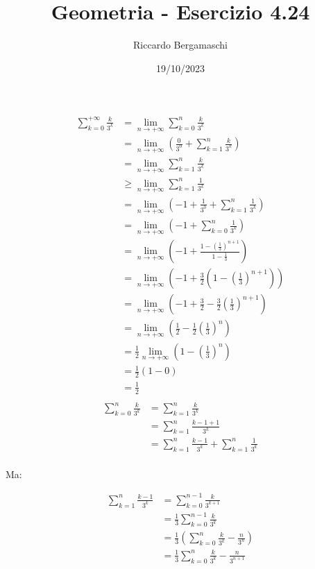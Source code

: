\documentclass{article}
\title{Geometria - Esercizio 4.24}
\author{Riccardo Bergamaschi}
\date{19/10/2023}
\newcommand*{\oo}{\infty}
\newcommand*{\limit}[2]{\lim_{#1\rightarrow#2}}
\begin{document}
\[\begin{aligned}
    \sum_{k=0}^{+\oo}\frac{k}{3^k}
    &= \limit{n}{+\oo}\sum_{k=0}^{n}\frac{k}{3^k}\\
    &= \limit{n}{+\oo}\left(\frac{0}{3^0} + \sum_{k=1}^{n}\frac{k}{3^k}\right)\\
    &= \limit{n}{+\oo}\sum_{k=1}^{n}\frac{k}{3^k}\\
    &\ge \limit{n}{+\oo}\sum_{k=1}^{n}\frac{1}{3^k}\\
    &= \limit{n}{+\oo}\left(-1 +\frac{1}{3^0} + \sum_{k=1}^{n}\frac{1}{3^k}\right)\\
    &= \limit{n}{+\oo}\left(-1+\sum_{k=0}^{n}\frac{1}{3^k}\right)\\
    &= \limit{n}{+\oo}\left(-1+\frac{1-\left(\frac{1}{3}\right)^{n+1}}{1-\frac{1}{3}}\right)\\
    &= \limit{n}{+\oo}\left(-1+\frac{3}{2}\left(1-\left(\frac{1}{3}\right)^{n+1}\right)\right)\\
    &= \limit{n}{+\oo}\left(-1+\frac{3}{2}-\frac{3}{2}\left(\frac{1}{3}\right)^{n+1}\right)\\
    &= \limit{n}{+\oo}\left(\frac{1}{2}-\frac{1}{2}\left(\frac{1}{3}\right)^n\right)\\
    &= \frac{1}{2}\limit{n}{+\oo}\left(1-\left(\frac{1}{3}\right)^n\right)\\
    &= \frac{1}{2}\left(1-0\right)\\
    &= \frac{1}{2}\\
\end{aligned}\]
\pagebreak
\[\begin{aligned}
    \sum_{k=0}^{n}\frac{k}{3^k}
    &= \sum_{k=1}^{n}\frac{k}{3^k} \\
    &= \sum_{k=1}^{n}\frac{k-1+1}{3^k} \\
    &= \sum_{k=1}^{n}\frac{k-1}{3^k} + \sum_{k=1}^{n}\frac{1}{3^k} \\
\end{aligned}\]


Ma:


\[\begin{aligned}
    \sum_{k=1}^{n}\frac{k-1}{3^k}
    &= \sum_{k=0}^{n-1}\frac{k}{3^{k+1}} \\
    &= \frac{1}{3}\sum_{k=0}^{n-1}\frac{k}{3^k} \\
    &= \frac{1}{3}\left(\sum_{k=0}^{n}\frac{k}{3^k} - \frac{n}{3^n}\right) \\
    &= \frac{1}{3}\sum_{k=0}^{n}\frac{k}{3^k} - \frac{n}{3^{n+1}} \\
\end{aligned}\]
\end{document}
